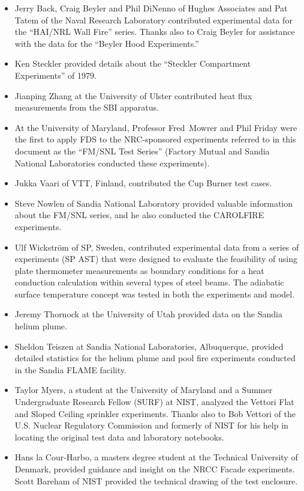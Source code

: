 \documentclass[11pt]{book}
\begin{document}
\begin{itemize}
\item Jerry Back, Craig Beyler and Phil DiNenno of Hughes Associates and Pat Tatem of the Naval Research Laboratory contributed experimental data for the ``HAI/NRL Wall Fire'' series. Thanks also to Craig Beyler for assistance with the data for the ``Beyler Hood Experiments.''
\item Ken Steckler provided details about the ``Steckler Compartment Experiments'' of 1979.
\item Jianping Zhang at the University of Ulster contributed heat flux measurements from the SBI apparatus.
\item At the University of Maryland, Professor Fred~Mowrer and Phil Friday were the first to apply FDS to the NRC-sponsored experiments referred to in this document as the ``FM/SNL Test Series'' (Factory Mutual and Sandia National Laboratories conducted these experiments).
\item Jukka Vaari of VTT, Finland, contributed the Cup Burner test cases.
\item Steve Nowlen of Sandia National Laboratory provided valuable information about the FM/SNL series, and he also conducted the CAROLFIRE experiments.
\item Ulf Wickstr\"{o}m of SP, Sweden, contributed experimental data from a series of experiments (SP AST) that were designed to evaluate the feasibility of using plate thermometer measurements as boundary conditions for a heat conduction calculation within several types of steel beams. The adiabatic surface temperature concept was tested in both the experiments and model.
\item Jeremy Thornock at the University of Utah provided data on the Sandia helium plume.
\item Sheldon Teiszen at Sandia National Laboratories, Albuquerque, provided detailed statistics for the helium plume and pool fire experiments conducted in the Sandia FLAME facility.
\item Taylor Myers, a student at the University of Maryland and a Summer Undergraduate Research Fellow (SURF) at NIST, analyzed the Vettori Flat and Sloped Ceiling sprinkler experiments. Thanks also to Bob Vettori of the U.S. Nuclear Regulatory Commission and formerly of NIST for his help in locating the original test data and laboratory notebooks.
\item Hans la Cour-Harbo, a masters degree student at the Technical University of Denmark, provided guidance and insight on the NRCC Facade experiments. Scott Bareham of NIST provided the technical drawing of the test enclosure.

\end{itemize}
\end{document}
